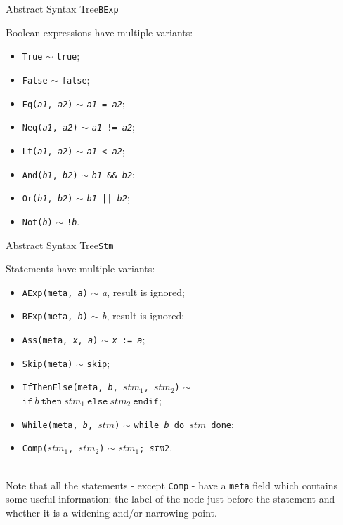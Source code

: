 \documentclass{beamer}
\newcommand{\sskip}{\texttt{skip}}
\newcommand{\ifelse}[3]{\mathtt{if}\ #1\ \mathtt{then}\ #2\ \mathtt{else}\ #3\ \mathtt{endif}}
\begin{document}
\begin{frame}{Abstract Syntax Tree}{\texttt{BExp}}

    Boolean expressions have multiple variants:
    \begin{itemize}
        \item \texttt{True} $\sim$ \texttt{true};
        \item \texttt{False} $\sim$ \texttt{false};
        \item \texttt{Eq(\textit{a1}, \textit{a2})} $\sim$ \texttt{\textit{a1} = \textit{a2}};
        \item \texttt{Neq(\textit{a1}, \textit{a2})} $\sim$ \texttt{\textit{a1} != \textit{a2}};
        \item \texttt{Lt(\textit{a1}, \textit{a2})} $\sim$ \texttt{\textit{a1} < \textit{a2}};
        \item \texttt{And(\textit{b1}, \textit{b2})} $\sim$ \texttt{\textit{b1} \&\& \textit{b2}};
        \item \texttt{Or(\textit{b1}, \textit{b2})} $\sim$ \texttt{\textit{b1} || \textit{b2}};
        \item \texttt{Not(\textit{b})} $\sim$ \texttt{!\textit{b}}.
    \end{itemize}

\end{frame}

\begin{frame}{Abstract Syntax Tree}{\texttt{Stm}}

    Statements have multiple variants:
    \begin{itemize}
        \item \texttt{AExp(meta, \textit{a})} $\sim$ \textit{a}, result is ignored;
        \item \texttt{BExp(meta, \textit{b})} $\sim$ \textit{b}, result is ignored;
        \item \texttt{Ass(meta, \textit{x}, \textit{a})} $\sim$ \texttt{\textit{x} := \textit{a}};
        \item \texttt{Skip(meta)} $\sim$ \sskip;
        \item \texttt{IfThenElse(meta, \textit{b}, $stm_1$, $stm_2$)} $\sim$ \\
              \hskip 1.5cm $\ifelse{\textit{b}}{stm_1}{stm_2}$;
        \item \texttt{While(meta, \textit{b}, $stm$)} $\sim$ \texttt{while \textit{b} do $stm$ done};
        \item \texttt{Comp($stm_1$, $stm_2$)} $\sim$ \texttt{$stm_1$; \textit{stm}2}.
    \end{itemize}

    ~\\
    Note that all the statements - except \texttt{Comp} - have a \texttt{meta} field which contains some useful information: the label of the node just before the statement and whether it is a widening and/or narrowing point.

\end{frame}
\end{document}
